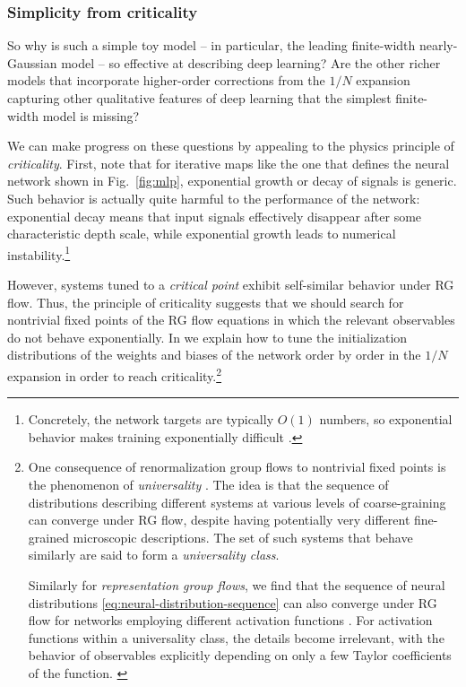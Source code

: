 \documentclass[12pt]{article}
\begin{document}
\subsubsection*{Simplicity from criticality}



So why is such a simple toy model -- in particular, the leading finite-width nearly-Gaussian model -- so effective at describing deep learning? Are the other richer models that incorporate higher-order corrections from the $1/N$ expansion capturing other qualitative features of deep learning that the simplest finite-width model is missing? 

We can make progress on these questions by appealing to the physics principle of \emph{criticality}. First, note that for iterative maps like the one that defines the neural network shown in Fig.~\ref{fig:mlp}, exponential growth or decay of signals is generic. Such behavior is actually quite harmful to the performance of the network: exponential decay means that input signals effectively disappear after some characteristic depth scale, while exponential growth leads to numerical instability.\footnote{
    Concretely, the network targets are typically $O(1)$ numbers, so exponential behavior makes training exponentially difficult \cite{poole2016exponential,raghu2017expressive,schoenholz2016deep}.
} 


However, systems tuned to a \emph{critical point} exhibit self-similar behavior under RG flow. Thus, the principle of criticality suggests that we should search for nontrivial fixed points of the RG flow equations in which the relevant observables do not behave exponentially.  In \cite{Principles} we explain how to tune the initialization distributions of the weights and biases of the network order by order in the $1/N$ expansion in order to reach criticality.\footnote{
One consequence of renormalization group flows to nontrivial fixed points is the phenomenon of \emph{universality} \cite{Kadanoff:1971pc}. The idea is that the sequence of distributions describing different systems at various levels of coarse-graining can converge under RG flow, despite having potentially very different fine-grained microscopic descriptions. The set of such systems that behave similarly are said to form a \emph{universality class}.

Similarly for \emph{representation group flows}, we find that the sequence of neural distributions \eqref{eq:neural-distribution-sequence} can also converge under RG flow for networks employing different activation functions \cite{Principles}. For activation functions within a universality class, the details 
become irrelevant, with the behavior of observables explicitly depending on only a few Taylor coefficients of the function. \label{footnote:universality}
}
\end{document}
